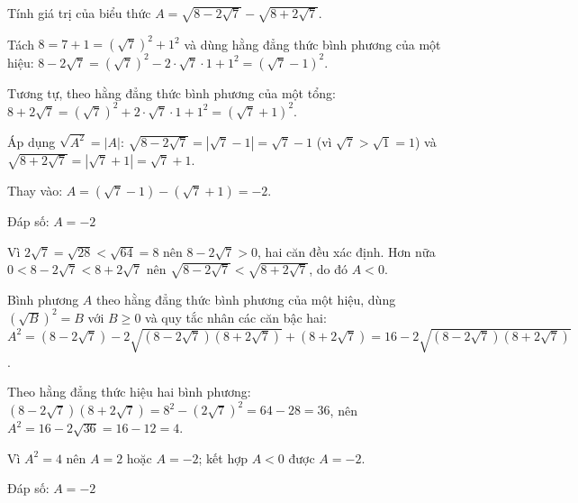 \begin{problem}[9DS-CAN-014]
Tính giá trị của biểu thức $A = \sqrt{8 - 2\sqrt{7}} - \sqrt{8 + 2\sqrt{7}}$.

\begin{solution}
Tách $8 = 7 + 1 = (\sqrt{7})^2 + 1^2$ và dùng hằng đẳng thức bình phương của một hiệu: $8 - 2\sqrt{7} = (\sqrt{7})^2 - 2 \cdot \sqrt{7} \cdot 1 + 1^2 = (\sqrt{7} - 1)^2$.

Tương tự, theo hằng đẳng thức bình phương của một tổng: $8 + 2\sqrt{7} = (\sqrt{7})^2 + 2 \cdot \sqrt{7} \cdot 1 + 1^2 = (\sqrt{7} + 1)^2$.

Áp dụng $\sqrt{A^2} = |A|$: $\sqrt{8 - 2\sqrt{7}} = |\sqrt{7} - 1| = \sqrt{7} - 1$ (vì $\sqrt{7} > \sqrt{1} = 1$) và $\sqrt{8 + 2\sqrt{7}} = |\sqrt{7} + 1| = \sqrt{7} + 1$.

Thay vào: $A = (\sqrt{7} - 1) - (\sqrt{7} + 1) = -2$.

Đáp số: $\boxed{A = -2}$
\end{solution}

\begin{solution}
Vì $2\sqrt{7} = \sqrt{28} < \sqrt{64} = 8$ nên $8 - 2\sqrt{7} > 0$, hai căn đều xác định. Hơn nữa $0 < 8 - 2\sqrt{7} < 8 + 2\sqrt{7}$ nên $\sqrt{8 - 2\sqrt{7}} < \sqrt{8 + 2\sqrt{7}}$, do đó $A < 0$.

Bình phương $A$ theo hằng đẳng thức bình phương của một hiệu, dùng $(\sqrt{B})^2 = B$ với $B \geq 0$ và quy tắc nhân các căn bậc hai: $A^2 = (8 - 2\sqrt{7}) - 2\sqrt{(8 - 2\sqrt{7})(8 + 2\sqrt{7})} + (8 + 2\sqrt{7}) = 16 - 2\sqrt{(8 - 2\sqrt{7})(8 + 2\sqrt{7})}$.

Theo hằng đẳng thức hiệu hai bình phương: $(8 - 2\sqrt{7})(8 + 2\sqrt{7}) = 8^2 - (2\sqrt{7})^2 = 64 - 28 = 36$, nên $A^2 = 16 - 2\sqrt{36} = 16 - 12 = 4$.

Vì $A^2 = 4$ nên $A = 2$ hoặc $A = -2$; kết hợp $A < 0$ được $A = -2$.

Đáp số: $\boxed{A = -2}$
\end{solution}
\end{problem}

